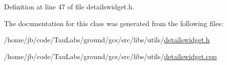 \-Definition at line 47 of file detailswidget.\-h.



\-The documentation for this class was generated from the following files\-:\begin{DoxyCompactItemize}
\item 
/home/jb/code/\-Tau\-Labs/ground/gcs/src/libs/utils/\hyperlink{detailswidget_8h}{detailswidget.\-h}\item 
/home/jb/code/\-Tau\-Labs/ground/gcs/src/libs/utils/\hyperlink{detailswidget_8cpp}{detailswidget.\-cpp}\end{DoxyCompactItemize}

